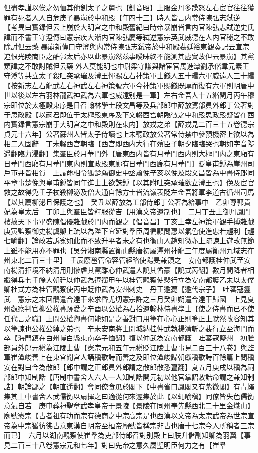 但盡孝謹以俟之勿恤其他釗太子之舅也【釗音昭】上服金丹多躁怒左右宦官往往獲罪有死者人人自危庚子暴崩於中和殿【年四十三】時人皆言内常侍陳弘志弑逆　【考異曰實録但云上崩於大明宫之中和殿舊紀曰時帝暴崩皆言内官陳弘志弑逆史氏諱而不書王守澄傳曰憲宗疾大漸内官陳弘慶等弑逆憲宗英武威德在人内官秘之不敢除討但云藥暴崩新傳曰守澄與内常侍陳弘志弑帝於中和殿裴廷裕東觀奏記云宣宗追恨光陵商臣之酷郭太后亦以此暴崩然兹事曖昧終不能測其虚實故但云暴崩】其黨類諱之不敢討賊但云藥外人莫能明也中尉梁守謙與諸宦官馬進潭劉承偕韋元素王守澄等共立太子殺吐突承璀及澧王惲賜左右神策軍士錢人五十緡六軍威遠人三十緡【按新志左右龍武左右神武左右神策號六軍今神策軍賜錢既厚而復有六軍則明唐中世以後以左右羽林龍武神武為六軍也威遠别是一軍】左右金吾人十五緡閏月丙午穆宗即位於太極殿東序是日召翰林學士段文昌等及兵部郎中薛放駕部員外郎丁公著對于思政殿【以嗣君即位于太極殿東序及下文輟西宫朝臨徵之中和殿思政殿疑皆在西内實録言憲宗崩于大明宫之中和殿則在東内】放戎之弟【薛戎見二百三十五卷德宗貞元十六年】公著蘇州人皆太子侍讀也上未聽政放公著常侍禁中參預機密上欲以為相二人固辭　丁未輟西宫朝臨【西宫即西内大行在殯臣子朝夕臨臨哭也朝如字音陟遥翻臨力浸翻】集羣臣於月華門外【唐東西内皆有月華門西内則大極門内之東廂有日華門西廂有月華門東内則宣政殿東廊有日華門西廊有月華門】貶皇甫鎛為崖州司戶市井皆相賀　上議命相令狐楚薦御史中丞蕭俛辛亥以俛及段文昌皆為中書侍郎同平章事楚俛與皇甫鎛皆同年進士上欲誅鎛【以其附吐突承璀欲立澧王也】俛及宦官救之故得免壬子杖殺柳泌及僧大通自餘方士皆流嶺表貶左金吾將軍李道古循州司馬【以其薦柳泌且保護之也】　癸丑以薛放為工部侍郎丁公著為給事中　乙卯尊郭貴妃為皇太后　丁卯上與羣臣皆釋服從吉【用漢文帝遺制也】　二月丁丑上御丹鳳門樓赦天下事畢盛陳倡優雜戲於門内而觀之【倡音昌】丁亥上幸左神策軍觀手搏雜戲庚寅監察御史楊虞卿上疏以為陛下宜延對羣臣周徧顧問惠以氣色使進忠若趨利【趨七喻翻】論政若訴寃如此而不致升平者未之有也衡山人趙知微亦上疏諫上遊畋無節上雖不能用亦不罪也【吳分湘南縣置衡山縣唐初屬潭州神龍三年度屬衡州九域志在州東北二百三十里】　壬辰廢邕管命容管經略使陽旻兼領之　安南都護桂仲武至安南楊清拒境不納清用刑慘虐其黨離心仲武遣人說其酋豪【說式芮翻】數月間降者相繼得兵七千餘人朝廷以仲武為逗遛甲午以桂管觀察使裴行立為安南都護乙未以太僕卿杜式方為桂管觀察使丙申貶仲武為安州刺史　丹王逾薨【逾代宗子】　吐蕃寇靈武　憲宗之末回鶻遣合達干來求昏尤切憲宗許之三月癸卯朔遣合達干歸國　上見夏州觀察判官柳公權書跡愛之辛酉以公權為右拾遺翰林侍書學士【使之侍書而已不使任代言之職】上問公權卿書何能如是之善對曰用筆在心心正則筆正上默然改容知其以筆諫也公權公綽之弟也　辛未安南將士開城納桂仲武執楊清斬之裴行立至海門而卒【海門鎮在白州博白縣東南卒子恤翻】復以仲武為安南都護　吐蕃寇鹽州　初膳部員外郎元稹為江陵士曹【憲宗元和五年元稹貶江陵士曹事見二百三十八卷】與監軍崔潭峻善上在東宫聞宫人誦稹歌詩而善之及即位潭峻歸朝獻稹歌詩百餘篇上問稹安在對曰今為散郎【郎中謂之正郎員外郎謂之散郎散悉亶翻】夏五月庚戌以稹為祠部郎中知制誥【唐制中書舍人六人一人知制誥開元初以他官掌詔敇誥命謂之兼知制誥】朝論鄙之【朝直遥翻】會同僚食瓜於閣下【中書省曰鳳閣又有紫微閣】有青蠅集其上中書舍人武儒衡以扇揮之曰適從何來遽集於此【以蠅喻稹】同僚皆失色儒衡意氣自若　庚申葬神聖章武孝皇帝于景陵【景陵在同州奉先縣西北二十里金熾山】廟號憲宗【古者祖有功而宗有德商之中宗高宗是也西漢以文帝為太宗武帝為世宗宣帝為中宗猶彷彿古意東漢自明帝至桓帝廟號皆稱宗非古也唐十七宗今人所稱者三宗而已】　六月以湖南觀察使崔羣為吏部侍郎召對别殿上曰朕升儲副知卿為羽翼【事見二百三十八卷憲宗元和七年】對曰先帝之意久屬聖明臣何力之有【崔羣